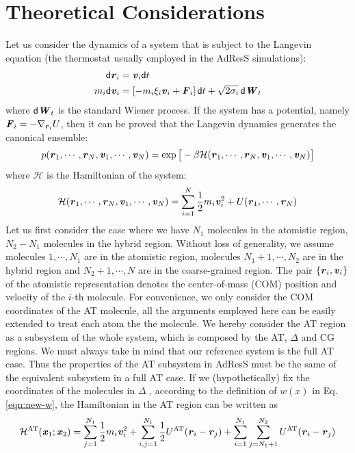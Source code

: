 \documentclass[aps,pre,preprint]{revtex4}
\renewcommand{\v}[1]{\textbf{\textit{#1}}}
\renewcommand{\d}[1]{\textsf{#1}}
\begin{document}
\section{Theoretical Considerations}
Let us consider the dynamics of a system that is subject to the Langevin equation (the thermostat usually employed in the AdResS simulations):
\begin{align}
  \d d\v r_i &= \v v_i\d dt\\
  m_i\d d\v v_i &= [-m_i\xi_i\v v_i + \v F_i]\,\d dt + \sqrt{2\sigma_i}\,\d d\v W_t
\end{align}
where $\d d\v W_t$ is the standard Wiener process.  If the system has a
potential, namely $\v F_i = -\nabla_{\v r_i}U$, then it can be proved that the
Langevin dynamics generates the canonical ensemble:
\begin{align}
  p(\v r_1, \cdots, \v r_N, \v v_1, \cdots, \v v_N)
  = \exp\big[
  -\beta \mathcal H(\v r_1, \cdots, \v r_N, \v v_1, \cdots, \v v_N)
  \big]
\end{align}
where $\mathcal H$ is the Hamiltonian of the system:
\begin{align}
  \mathcal H(\v r_1, \cdots, \v r_N, \v v_1, \cdots, \v v_N)
  =
  \sum_{i=1}^N\frac12 m_i\v v_i^2 + U(\v r_1, \cdots, \v r_N)  
\end{align}
Let us first consider the case where we have $N_1$
molecules in the atomistic region, $N_2 - N_1$ molecules in the hybrid
region.  Without loss of generality, we assume molecules $1, \cdots,
N_1$ are in the atomistic region, molecules $N_1 + 1, \cdots, N_2$ are
in the hybrid region and $N_2+1, \cdots, N$ are in the coarse-grained
region. The pair $\{\v r_i, \v v_i\}$ of the atomistic representation
denotes the center-of-mass (COM) position and velocity of the $i$-th
molecule. For convenience, we only consider the COM coordinates of the
AT molecule, all the arguments employed here
can be easily extended to treat each atom the the molecule.
We hereby consider the AT region as a subsystem of the whole
system, which is composed by the AT, $\Delta$ and CG
regions. We must always take in mind that our reference system is the full AT case.
Thus the properties of the AT subsystem in AdResS must be the same of the equivalent subsystem in a full AT case.
 If we (hypothetically) fix the coordinates of the molecules in $\Delta$ , according to the definition of $w(x)$ in Eq.\ref{eqn:new-w}, the Hamiltonian in the AT region can be written as
\begin{align}
  \mathcal H^{\textrm{AT}}(\v x_1; \v x_2) =
  \sum_{j=1}^{N_1}\frac12 m_i\v v_i^2 + 
  \sum_{i,j=1}^{N_1}\frac12 U^{\textrm{AT}}(\v r_i - \v r_j) + 
  \sum_{i=1}^{N_1}\sum_{j=N_1+1}^{N_2} U^{\textrm{AT}}(\v r_i - \v r_j) 
\end{align}
\end{document}

